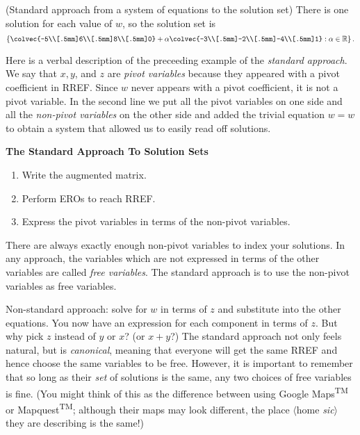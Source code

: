 \begin{example}{(Standard approach  from a system of equations to the solution set)}
There is one solution for each value of $w$, so the solution set is 
\[
\left\{    \colvec{-5\\[.5mm]6\\[.5mm]8\\[.5mm]0} 
+ 
\alpha \colvec{-3\\[.5mm]-2\\[.5mm]-4\\[.5mm]1} : \alpha \in \mathbb{R} \right\}.
\]
\end{example}
Here is a verbal description of the preceeding example of the \hypertarget{standard approach}{{\itshape standard approach}}. We say that $x,y$, and $z$ are {\itshape pivot variables} because they appeared with a  pivot coefficient in RREF. 
Since $w$ never appears with a pivot  coefficient, 
 it is not a pivot variable. %
In the second line we put all the pivot variables on one side 
and all the {\itshape non-pivot variables} on the other side and added the trivial equation $w=w$ to obtain a system that allowed us to easily read off solutions.

\begin{center}
{\Large{\bfseries The Standard Approach To Solution Sets}}
\end{center}
\begin{enumerate}
\item Write the augmented matrix.
\item Perform EROs to reach RREF.
\item Express the pivot variables in terms of the non-pivot variables. 
\end{enumerate}
There are always exactly enough non-pivot variables to index your solutions. 
In any approach, the variables which are not expressed in terms of the other variables are called  {\itshape free variables}. The standard approach is to use the non-pivot variables as free variables.

Non-standard approach: solve for $w$ in terms of $z$ and substitute into the other equations. You now have an expression for each component in terms of $z$. But why pick $z$ instead of $y$ or $x$? (or $x+y$?) The standard approach not only feels natural, 
but is {\itshape canonical}, meaning that everyone will get the same RREF and hence choose the same variables to be free.
However, it is important to remember that so long as their {\itshape set} of solutions is the same, any two choices of free variables is fine.
(You might think of this as the difference between using Google Maps\textsuperscript{\sffamily TM} or Mapquest\textsuperscript{\sffamily TM}; although their maps may look different, 
the place 
$\langle$home {\itshape sic}$\rangle$ 
they are describing is the same!)


